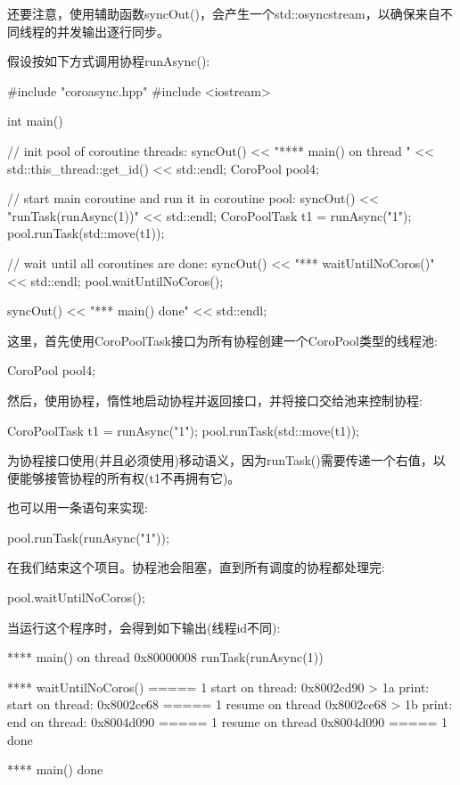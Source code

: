 还要注意，使用辅助函数syncOut()，会产生一个std::osyncstream，以确保来自不同线程的并发输出逐行同步。

假设按如下方式调用协程runAsync():


\begin{cpp}
#include "coroasync.hpp"
#include <iostream>

int main()
{
	// init pool of coroutine threads:
	syncOut() << "**** main() on thread " << std::this_thread::get_id()
			  << std::endl;
	CoroPool pool{4};
	
	// start main coroutine and run it in coroutine pool:
	syncOut() << "runTask(runAsync(1))" << std::endl;
	CoroPoolTask t1 = runAsync("1");
	pool.runTask(std::move(t1));
	
	// wait until all coroutines are done:
	syncOut() << "\n**** waitUntilNoCoros()" << std::endl;
	pool.waitUntilNoCoros();
	
	syncOut() << "\n**** main() done" << std::endl;
}
\end{cpp}

这里，首先使用CoroPoolTask接口为所有协程创建一个CoroPool类型的线程池:

\begin{cpp}
CoroPool pool{4};
\end{cpp}

然后，使用协程，惰性地启动协程并返回接口，并将接口交给池来控制协程:

\begin{cpp}
CoroPoolTask t1 = runAsync("1");
pool.runTask(std::move(t1));
\end{cpp}

为协程接口使用(并且必须使用)移动语义，因为runTask()需要传递一个右值，以便能够接管协程的所有权(t1不再拥有它)。

也可以用一条语句来实现:

\begin{cpp}
pool.runTask(runAsync("1"));
\end{cpp}

在我们结束这个项目。协程池会阻塞，直到所有调度的协程都处理完:

\begin{cpp}
pool.waitUntilNoCoros();
\end{cpp}

当运行这个程序时，会得到如下输出(线程id不同):

\begin{shell}
**** main() on thread 0x80000008
runTask(runAsync(1))

**** waitUntilNoCoros()
===== 1 start on thread: 0x8002cd90
    > 1a print: start on thread: 0x8002ce68
===== 1 resume on thread 0x8002ce68
    > 1b print: end on thread: 0x8004d090
===== 1 resume on thread 0x8004d090
===== 1 done

**** main() done
\end{shell}

